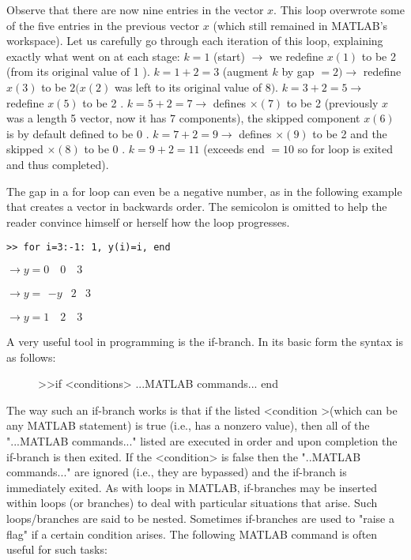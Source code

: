 \documentclass[../main.tex]{subfiles}
\begin{document}
Observe that there are now nine entries in the vector $x$. This loop overwrote some of the five entries in the previous vector $x$ (which still remained in MATLAB's workspace). Let us carefully go through each iteration of this loop, explaining exactly what went on at each stage:
$k=1$ (start) $\rightarrow$ we redefine $x(1)$ to be 2 (from its original value of 1 ).
$k=1+2=3$ (augment $k$ by gap $=2) \rightarrow$ redefine $x(3)$ to be $2(x(2)$ was left to its original value of 8$)$.
$k=3+2=5 \rightarrow$ redefine $x(5)$ to be 2 .
$k=5+2=7 \rightarrow$ defines $\times(7)$ to be 2 (previously $x$ was a length 5 vector, now it has 7 components), the skipped component $x(6)$ is by default defined to be 0 . $k=7+2=9 \rightarrow$ defines $\times(9)$ to be 2 and the skipped $\times(8)$ to be 0 .
$k=9+2=11$ (exceeds end $=10$ so for loop is exited and thus completed).

The gap in a for loop can even be a negative number, as in the following example
that creates a vector in backwards order. The semicolon is omitted to help the
reader convince himself or herself how the loop progresses. 

\begin{verbatim}>> for i=3:-1: 1, y(i)=i, end\end{verbatim}
$\rightarrow y=0 \quad 0 \quad 3$

$\rightarrow y=\begin{array}{lll}-y & 2 & 3\end{array}$

$\rightarrow y=1 \quad 2 \quad 3$

A very useful tool in programming is the if-branch. In its basic form the syntax is as follows:

\begin{figure}[H]
\centering
\begin{boxedverbatim}
>>if <conditions>
	...MATLAB commands...
end
\end{boxedverbatim}
\end{figure}

The way such an if-branch works is that if the listed <condition >(which can be any MATLAB statement) is true (i.e., has a nonzero value), then all of the "...MATLAB commands..." listed are executed in order and upon completion the if-branch is then exited. If the <condition> is false then the "..MATLAB commands..." are ignored (i.e., they are bypassed) and the if-branch is immediately exited. As with loops in MATLAB, if-branches may be inserted within loops (or branches) to deal with particular situations that arise. Such loops/branches are said to be nested. Sometimes if-branches are used to "raise a flag" if a certain condition arises. The following MATLAB command is often useful for such tasks:\\
\end{document}
